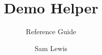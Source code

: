 \documentclass{technical-reference-manual}
\title{Demo Helper}
\subtitle{Reference Guide}
\author{Sam Lewis}
\begin{document}
	
	\graphicspath{ {./assets/} }
	
	\maketitle
	
	\tableofcontents
	\newpage
	
	
	\pagebreak
	
	\pagebreak
	
\end{document}
